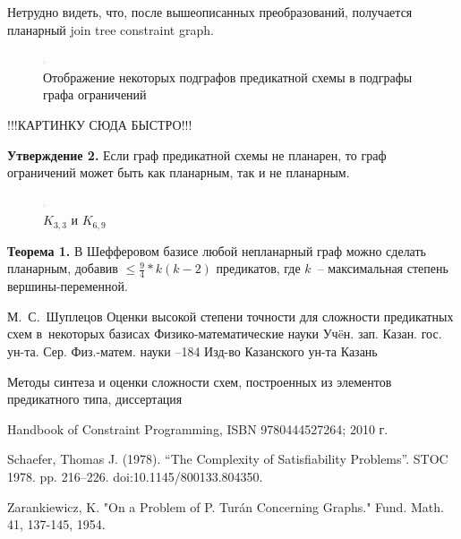 \documentclass[12pt]{article}
\begin{document}
Нетрудно видеть, что, после вышеописанных преобразований, получается планарный join tree constraint graph.

\begin{figure}[htb]
\centering
\includegraphics[width=0.01\textwidth]{constraint_graph.png}
\caption{Отображение некоторых подграфов предикатной схемы в подграфы графа ограничений}
\label{fig:induced_to_constraint}
\end{figure}
!!!КАРТИНКУ СЮДА БЫСТРО!!!

\textbf{Утверждение 2.} Если граф предикатной схемы не планарен, то граф ограничений может быть как планарным, 
так и не планарным.

\begin{figure}[htb]
\centering
\includegraphics[width=0.01\textwidth]{constraint_graph.png}
\caption{$K_{3,3}$ и $K_{6,9}$}
\label{fig:planar_non_planar}
\end{figure}

\textbf{Теорема 1.} В Шефферовом базисе любой непланарный граф можно сделать планарным, 
добавив $\leq \frac{9}{4}*k(k-2)$ предикатов, где $k$~-- максимальная степень вершины-переменной.

\clearpage
{}
    \by М.~С.~Шуплецов
    \paper Оценки высокой степени точности для сложности предикатных схем в~некоторых базисах
    \inbook Физико-математические науки
    \serial Уч\"eн. зап. Казан. гос. ун-та. Сер. Физ.-матем. науки
    --184
    \publ Изд-во Казанского ун-та
    \publaddr Казань

Методы синтеза и оценки сложности схем, построенных из элементов предикатного типа, диссертация

 Handbook of Constraint Programming, ISBN 9780444527264; 2010 г.

 Schaefer, Thomas J. (1978). 
``The Complexity of Satisfiability Problems''. STOC 1978. pp. 216–226. doi:10.1145/800133.804350.

 Zarankiewicz, K. "On a Problem of P. Turán Concerning Graphs." Fund. Math. 41, 137-145, 1954. 
\end{document}
